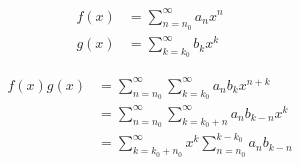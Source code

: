 \documentclass[a4paper,10pt,fleqn]{scrartcl}
\begin{document}
    \begin{align*}
        f(x) &= \sum\limits_{n=n_0}^\infty a_n x^n \\
        g(x) &= \sum\limits_{k=k_0}^\infty b_k x^k
    \end{align*}

    \begin{align*}
        f(x)g(x)
        &=
        \sum\limits_{n=n_0}^\infty
        \sum\limits_{k=k_0}^\infty
        a_n
        b_k
        x^{n+k}
        \\
        &=
        \sum\limits_{n=n_0}^\infty
        \sum\limits_{k=k_0+n}^\infty
        a_n
        b_{k-n}
        x^k
        \\
        &=
        \sum\limits_{k=k_0+n_0}^\infty
        x^k
        \sum\limits_{n=n_0}^{k-k_0}
        a_n
        b_{k-n}
    \end{align*}
\end{document}
